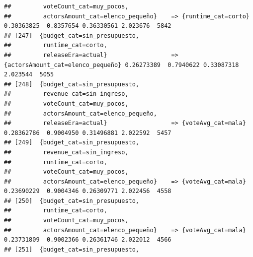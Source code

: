 \documentclass[
]{article}
\begin{document}
\begin{verbatim}
##         voteCount_cat=muy_pocos,                                                                                                
##         actorsAmount_cat=elenco_pequeño}    => {runtime_cat=corto}               0.30363825  0.8357654 0.36330561 2.023676  5842
## [247]  {budget_cat=sin_presupuesto,                                                                                             
##         runtime_cat=corto,                                                                                                      
##         releaseEra=actual}                  => {actorsAmount_cat=elenco_pequeño} 0.26273389  0.7940622 0.33087318 2.023544  5055
## [248]  {budget_cat=sin_presupuesto,                                                                                             
##         revenue_cat=sin_ingreso,                                                                                                
##         voteCount_cat=muy_pocos,                                                                                                
##         actorsAmount_cat=elenco_pequeño,                                                                                        
##         releaseEra=actual}                  => {voteAvg_cat=mala}                0.28362786  0.9004950 0.31496881 2.022592  5457
## [249]  {budget_cat=sin_presupuesto,                                                                                             
##         revenue_cat=sin_ingreso,                                                                                                
##         runtime_cat=corto,                                                                                                      
##         voteCount_cat=muy_pocos,                                                                                                
##         actorsAmount_cat=elenco_pequeño}    => {voteAvg_cat=mala}                0.23690229  0.9004346 0.26309771 2.022456  4558
## [250]  {budget_cat=sin_presupuesto,                                                                                             
##         runtime_cat=corto,                                                                                                      
##         voteCount_cat=muy_pocos,                                                                                                
##         actorsAmount_cat=elenco_pequeño}    => {voteAvg_cat=mala}                0.23731809  0.9002366 0.26361746 2.022012  4566
## [251]  {budget_cat=sin_presupuesto,                                                                                             

\end{verbatim}
\end{document}
